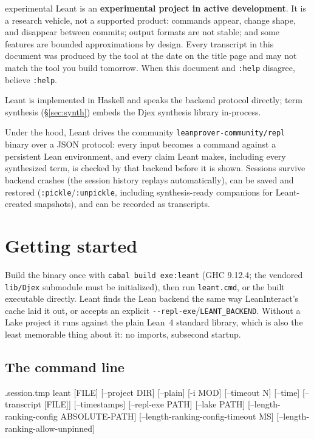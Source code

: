 \documentclass[11pt,oneside]{article}
\newcommand{\code}[1]{\texttt{#1}}
\newenvironment{session}
 {\VerbatimEnvironment\begin{VerbatimOut}{\jobname.session.tmp}}
 {\end{VerbatimOut}%
  \begin{sessionouter}%
  \VerbatimInput[fontsize=\footnotesize, breaklines=true,
    breaksymbolleft={\textcolor{stone}{\footnotesize$\hookrightarrow$}},
    formatcom=\color{ink}, tabsize=4]{\jobname.session.tmp}%
  \end{sessionouter}}
\begin{document}
\begin{notice}{experimental}
Leant is an \textbf{experimental project in active development}. It is
a research vehicle, not a supported product: commands appear, change
shape, and disappear between commits; output formats are not stable;
and some features are bounded approximations by design. Every
transcript in this document was produced by the tool at the date on
the title page and may not match the tool you build tomorrow. When
this document and \code{:help} disagree, believe \code{:help}.
\end{notice}

Leant is implemented in Haskell and speaks the backend protocol
directly; term synthesis (\S\ref{sec:synth}) embeds the Djex synthesis
library in-process.

Under the hood, Leant drives the community
\code{leanprover-community/repl} binary over a JSON protocol: every
input becomes a command against a persistent Lean environment, and
every claim Leant makes, including every synthesized term, is
checked by that backend before it is shown. Sessions survive backend
crashes (the session history replays automatically), can be saved and
restored (\code{:pickle}/\code{:unpickle}, including synthesis-ready
companions for Leant-created snapshots), and can be recorded as
transcripts.

\section{Getting started}\label{sec:start}

Build the binary once with \code{cabal build exe:leant} (GHC 9.12.4;
the vendored \code{lib/Djex} submodule must be initialized), then run
\code{leant.cmd}, or the built executable directly. Leant finds the
Lean backend the same way LeanInteract's cache laid it out, or accepts
an explicit \code{-{}-repl-exe}/\code{LEANT\_BACKEND}. Without a Lake
project it runs against the plain Lean~4 standard library, which is
also the least memorable thing about it: no imports, subsecond
startup.

\subsection*{The command line}

\begin{session}
leant [FILE] [--project DIR] [--plain] [-i MOD] [--timeout N] [--time]
      [--transcript [FILE]] [--timestamps] [--repl-exe PATH] [--lake PATH]
      [--length-ranking-config ABSOLUTE-PATH]
      [--length-ranking-config-timeout MS] [--length-ranking-allow-unpinned]
\end{session}
\end{document}
